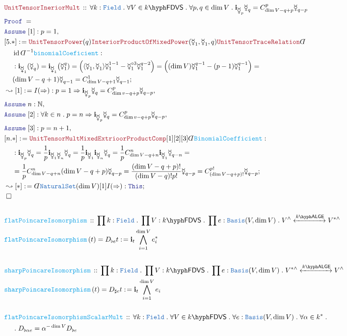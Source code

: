 \documentclass[12pt]{scrartcl}%
\newcommand{\TYPE}[1]{\textcolor{NavyBlue}{\mathtt{#1}}}%
\newcommand{\FUNC}[1]{\textcolor{Cerulean}{\mathtt{#1}}}%
\newcommand{\LOGIC}[1]{\textcolor{Blue}{\mathtt{#1}}}%
\newcommand{\THM}[1]{\textcolor{Maroon}{\mathtt{#1}}}%
\renewcommand{\.}{\; . \;} %
\newcommand{\de}{: \kern 0.1pc =} %
\newcommand{\Act}[1]{\left( #1 \right)} %
\newcommand{\Theorem}[2]{& \THM{#1} \, :: \, #2 \\ & \Proof = \\ } %
\newcommand{\DeclareFunc}[2]{& \FUNC{#1} \, :: \, #2 \\}%
\newcommand{\DefineNamedFunc}[4]{&  \FUNC{#1}\Act{#2} = #3 \de #4 \\}%
\newcommand{\NewLine}{\\ & \kern 1pc}%
\newcommand{\Page}[1]{ \begin{align*} #1 \end{align*}  }%
\newcommand{ \bd }{ \ByDef }%
\newcommand{\Nat}{\mathbb{N}}%
\DeclareMathOperator*{\id}{id}%
\newcommand{\Imply}{\Rightarrow}
\newcommand{\Conclude}[3]{& #1 \de #2 : #3; \\}%
\newcommand{\Derive}[3]{& \leadsto #1 \de #2 : #3, \\} %
\newcommand{\DeriveConclude}[3]{& \leadsto #1 \de #2 : #3 ; \\} %
\newcommand{\Assume}[2]{& \LOGIC{Assume} \; #1 : #2, \\} %
\newcommand{\QED}{\; \square} %
\newcommand{\EndProof}{& \QED \\} %
\newcommand{\ByDef}{\rotatebox[origin=c]{-180}{$D$}}%
\newcommand{\Proof}{\LOGIC{Proof} \; } %
\newcommand{\ToIso}[1]{\xleftrightarrow{#1}}%
\newcommand{\Basis}{\TYPE{Basis}} %
\newcommand{\FDVS}[1]{#1\hyph\mathsf{FDVS}} %
\newcommand{\Field}{\TYPE{Field}}
\newcommand{\LALGE}[1]{#1\hyph\mathsf{ALGE}}%
\begin{document}
\Page{
	\Theorem{UnitTensorIneriorMult}{
		\forall k : \Field \.
		\forall V \in \FDVS{k} \.
		\forall p,q \in  \dim V \.
		\mathbf{i}_{\mercury_p} \mercury_q =  C_{\dim V - q + p}^p \mercury_{q-p}
	}
	\Assume{[1]}{p = 1}
	\Conclude{[5.*]}{\THM{UnitTensorPower}(q)\THM{InteriorProductOfMixedPower}(\mercury_1,\mercury_1,q)\THM{UnitTensorTraceRelation}\bd \NewLine \id \bd^{-1} \FUNC{binomialCoeficient}}{
		\NewLine :
		\mathbf{i}_{\mercury_1}(\mercury_{q}) = 
		\mathbf{i}_{\mercury_1}\big( \mercury_1^{q} ) = 
		 \Big( \langle \mercury_1,\mercury_1 \rangle \mercury_1^{1-1}  - \mercury^{\circ 3}_1 \mercury_1^{q-2}  \Big) =
		 \Big(  (\dim V) \mercury^{q-1}_1 - (p - 1)\mercury^{q-1}_1  \Big) =  \NewLine 
		  (\dim V - q + 1 )    \mercury_{q-1} =  C^1_{\dim V - q + 1} \mercury_{q-1}
	}
	\Derive{[1]}{I(\Rightarrow)}{p=1 \Rightarrow \mathbf{i}_{\mercury_p} \mercury_q = C^p_{\dim v - q + p} \mercury_{q-p} }
	\Assume{n}{\Nat}
	\Assume{[2]}{\forall k \in n \. p =n \Rightarrow \mathbf{i}_{\mercury_p} \mercury_q = C^p_{\dim v - q + p} \mercury_{q-p} }
	\Assume{[3]}{p = n+ 1}
	\Conclude{[n.*]}{ \THM{UnitTensorMult} \THM{MixedExtrioorProductComp}[1][2][3] \bd \FUNC{BinomialCoefficient}  }
	{
		\NewLine :
		\mathbf{i}_{\mercury_p} \mercury_q = 
		\frac{1}{p}\mathbf{i}_{  \mercury_1 \mercury_n  } \mercury_q = 
		\frac{1}{p} \mathbf{i}_{\mercury_1} \mathbf{i}_{\mercury_n} \mercury_q =  
		\frac{1}{p} C^n_{\dim V - q + n} \mathbf{i}_{\mercury_1} \mercury_{q - n} = \NewLine = 
		\frac{1}{p} C^n_{\dim V - q + n} (\dim V - q + p) \mercury_{q - p} =
		\frac{(\dim V - q + p)!}{ (\dim V - q)! p!   } \mercury_{q - p}  = 
		C^{p!}_{(\dim V - q + p)!} \mercury_{q-p}
	}
	\DeriveConclude{[*]}{\bd \TYPE{NaturalSet}(\dim V)[1]I(\Imply)}{ \LOGIC{This}  }
	\EndProof
	\\
	\DeclareFunc{flatPoincareIsomorphism}{  \prod k : \Field \. \prod V : \FDVS{k} \. \prod e : \Basis(V,\dim V) \. V^\wedge \ToIso{\LALGE{k}} V^{*\wedge}}
	\DefineNamedFunc{flatPoincareIsomorphism}{ t }{ D_{\flat e} t}{ \mathbf{i}_t \bigwedge^{\dim V}_{i=1} e^*_i}
	\\
	\DeclareFunc{sharpPoincareIsomorphism}{  \prod k : \Field \. \prod V : \FDVS{k} \. \prod e : \Basis(V,\dim V) \. V^{*\wedge} \ToIso{\LALGE{k}} V^{\wedge}}
	\DefineNamedFunc{sharpPoincareIsomorphism}{ t }{ D_{\sharp e} t}{\mathbf{i}_t \bigwedge^{\dim V}_{i=1} e_i}
	\\
	\DeclareFunc{flatPoincareIsomorphismScalarMult}
	{
		\forall k : \Field \.
		\forall V \in \FDVS{k} \.
		\forall e : \Basis(V,\dim V) \.
		\forall \alpha \in k^* \.\NewLine \.
		D_{\flat \alpha e} = \alpha^{-\dim V} D_{\flat e} 
}}
\end{document}
